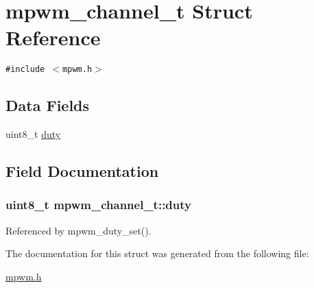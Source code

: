 \hypertarget{structmpwm__channel__t}{
\section{mpwm\_\-channel\_\-t Struct Reference}
\label{structmpwm__channel__t}
}
{\tt \#include $<$mpwm.h$>$}

\subsection*{Data Fields}
\begin{CompactItemize}
\item 
uint8\_\-t \hyperlink{structmpwm__channel__t_ccfdfb004f356e76e6dfd75bffc7eac3}{duty}
\end{CompactItemize}


\subsection{Field Documentation}
\hypertarget{structmpwm__channel__t_ccfdfb004f356e76e6dfd75bffc7eac3}{
\subsubsection{\setlength{\rightskip}{0pt plus 5cm}uint8\_\-t {\bf mpwm\_\-channel\_\-t::duty}}}
\label{structmpwm__channel__t_ccfdfb004f356e76e6dfd75bffc7eac3}




Referenced by mpwm\_\-duty\_\-set().

The documentation for this struct was generated from the following file:\begin{CompactItemize}
\item 
\hyperlink{mpwm_8h}{mpwm.h}\end{CompactItemize}
